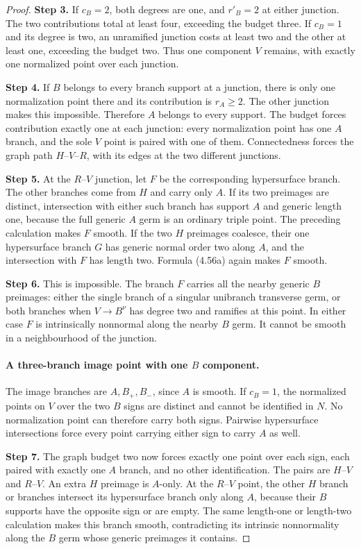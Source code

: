 \begin{proof}
\noindent\textbf{Step 3.} If $c_B=2$, both degrees are one, and $r'_B=2$ at either
junction. The two contributions total at least four,
exceeding the budget three. If $c_B=1$ and its degree is
two, an unramified junction costs at least two and the
other at least one, exceeding the budget two. Thus one
component $V$ remains, with exactly one normalized point
over each junction.

\noindent\textbf{Step 4.} If $B$ belongs to every branch support at a junction,
there is only one normalization point there and its
contribution is $r_A\ge2$. The other junction makes this
impossible. Therefore $A$ belongs to every support. The
budget forces contribution exactly one at each junction:
every normalization point has one $A$ branch, and the
sole $V$ point is paired with one of them. Connectedness
forces the graph path $H$--$V$--$R$, with its edges at
the two different junctions.

\noindent\textbf{Step 5.} At the $R$--$V$ junction, let $F$ be the corresponding
hypersurface branch. The other branches come from $H$
and carry only $A$. If its two preimages are distinct,
intersection with either such branch has support $A$ and
generic length one, because the full generic $A$ germ
is an ordinary triple point. The preceding calculation
makes $F$ smooth. If the two $H$ preimages coalesce,
their one hypersurface branch $G$ has generic normal
order two along $A$, and the intersection with $F$ has
length two. Formula (4.56a) again makes $F$ smooth.

\noindent\textbf{Step 6.} This is impossible. The branch $F$ carries all the nearby
generic $B$ preimages: either the single branch of a
singular unibranch transverse germ, or both branches
when $V\to B^\nu$ has degree two and ramifies at this
point. In either case $F$ is intrinsically nonnormal
along the nearby $B$ germ. It cannot be smooth in a
neighbourhood of the junction.

\paragraph{A three-branch image point with one $B$ component.}
The image branches are $A,B_+,B_-$, since $A$ is smooth.
If $c_B=1$, the normalized points on $V$ over the two
$B$ signs are distinct and cannot be identified in $N$.
No normalization point can therefore carry both signs.
Pairwise hypersurface intersections force every point
carrying either sign to carry $A$ as well.

\noindent\textbf{Step 7.} The graph budget two now forces exactly one point over
each sign, each paired with exactly one $A$ branch, and
no other identification. The pairs are $H$--$V$ and
$R$--$V$. An extra $H$ preimage is $A$-only. At the
$R$--$V$ point, the other $H$ branch or branches intersect
its hypersurface branch only along $A$, because their
$B$ supports have the opposite sign or are empty. The
same length-one or length-two calculation makes this
branch smooth, contradicting its intrinsic nonnormality
along the $B$ germ whose generic preimages it contains.


\end{proof}
